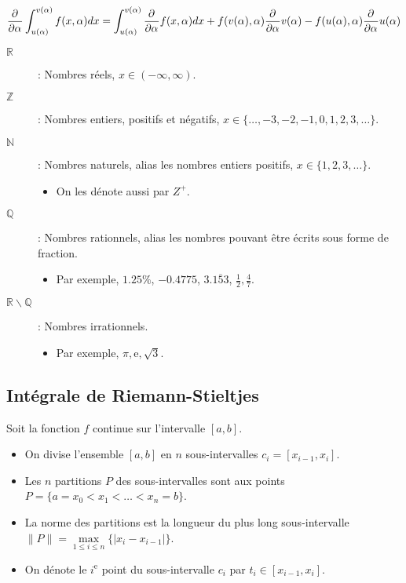 \documentclass[10pt, french]{article}
\begin{document}
\begin{multicols*}{2}
\begin{definitionNOHFILL}
	\setlength{\mathindent}{-.24cm}
\begin{equation*}
	\frac{\partial^{}}{\partial \alpha^{}} \int_{u(\alpha)}^{v(\alpha)} f(x, \alpha) dx = 
	\int_{u(\alpha)}^{v(\alpha)} \frac{\partial^{}}{\partial \alpha^{}}  f(x, \alpha) dx + f(v(\alpha), \alpha) \frac{\partial^{}}{\partial \alpha^{}} v(\alpha) - f(u(\alpha), \alpha) \frac{\partial^{}}{\partial \alpha^{}} u(\alpha)
\end{equation*}
	\setlength{\mathindent}{1cm}
\end{definitionNOHFILL}


\begin{definitionNOHFILL}[Domaines]
\begin{description}
	\item[$\mathds{R}$]: Nombres réels, $x \in (-\infty, \infty)$.
	\item[$\mathds{Z}$]: Nombres entiers, positifs et négatifs, $x \in \{\dots, -3, -2, -1, 0, 1, 2, 3, \dots\}$.
	\item[$\mathds{N}$]: Nombres naturels, alias les nombres entiers positifs, $x \in \{1, 2, 3, \dots\}$.
		\begin{itemize}
		\item	On les dénote aussi par $Z^{+}$.
		\end{itemize}
	\item[$\mathds{Q}$]: Nombres rationnels, alias les nombres pouvant être écrits sous forme de fraction.
		\begin{itemize}
		\item	Par exemple, $1.25\%$, $-0.4775$, $3.\overline{153}$, $\frac{1}{2}, \frac{4}{7}$.
		\end{itemize}			
	\item[$\mathds{R} \backslash \mathds{Q}$]: Nombres irrationnels.
		\begin{itemize}
		\item	Par exemple, $\pi, \mathrm{e}, \sqrt{3}$.
		\end{itemize}
\end{description}
\end{definitionNOHFILL}

\subsection*{Intégrale de Riemann-Stieltjes}
\begin{rappel_enhanced}
Soit la fonction $f$ continue sur l'intervalle $[a, b]$.
\begin{itemize}
	\item	On divise l'ensemble $[a, b]$ en $n$ sous-intervalles $c_{i} = [x_{i - 1}, x_{i}]$.
	\item	Les $n$ partitions $P$ des sous-intervalles sont aux points $P	=	\{a	=	x_{0} < x_{1} < \hdots < x_{n} = b\}$. 
	\item	La norme des partitions est la longueur du plus long sous-intervalle $\lVert P \rVert	=	\underset{1 \leq i \leq n}{\max}\{|x_{i} - x_{i - 1}|\}$.
	\item	On dénote le $i^{\text{e}}$ point du sous-intervalle $c_{i}$ par $t_{i} \in [x_{i - 1}, x_{i}]$.
\end{itemize}


\end{rappel_enhanced}
\end{multicols*}
\end{document}
